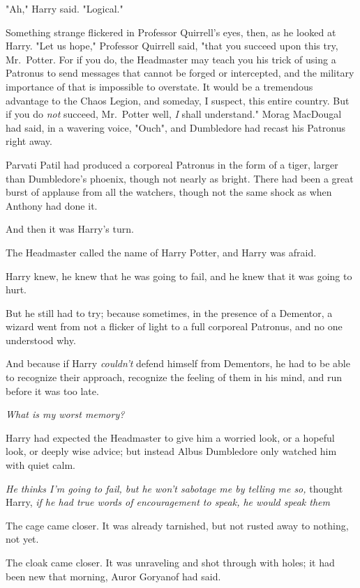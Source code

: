 "Ah," Harry said. "Logical."

Something strange flickered in Professor Quirrell's eyes, then, as he looked at
Harry. "Let us hope," Professor Quirrell said, "that you succeed upon this try,
Mr.~Potter. For if you do, the Headmaster may teach you his trick of using a
Patronus to send messages that cannot be forged or intercepted, and the
military importance of that is impossible to overstate. It would be a
tremendous advantage to the Chaos Legion, and someday, I suspect, this entire
country. But if you do \emph{not} succeed, Mr.~Potter{\el} well, \emph{I}
shall understand."
\sbreak
Morag MacDougal had said, in a wavering voice, "Ouch", and Dumbledore had
recast his Patronus right away.

Parvati Patil had produced a corporeal Patronus in the form of a tiger, larger
than Dumbledore's phoenix, though not nearly as bright. There had been a great
burst of applause from all the watchers, though not the same shock as when
Anthony had done it.

And then it was Harry's turn.

The Headmaster called the name of Harry Potter, and Harry was afraid.

Harry knew, he knew that he was going to fail, and he knew that it was going to
hurt.

But he still had to try; because sometimes, in the presence of a Dementor, a
wizard went from not a flicker of light to a full corporeal Patronus, and no
one understood why.

And because if Harry \emph{couldn't} defend himself from Dementors, he had to
be able to recognize their approach, recognize the feeling of them in his mind,
and run before it was too late.

\emph{What is my worst memory\el\kern\ellipsisgapitalic?}

Harry had expected the Headmaster to give him a worried look, or a hopeful
look, or deeply wise advice; but instead Albus Dumbledore only watched him with
quiet calm.

\emph{He thinks I'm going to fail, but he won't sabotage me by telling me so,}
thought Harry, \emph{if he had true words of encouragement to speak, he would
speak them{\el}}

The cage came closer. It was already tarnished, but not rusted away to nothing,
not yet.

The cloak came closer. It was unraveling and shot through with holes;
it had been new that morning, Auror Goryanof had said.

